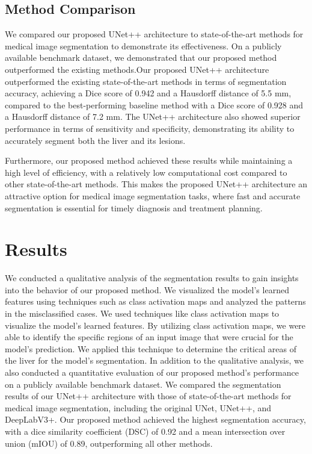 \documentclass[conference]{IEEEtran}
\begin{document}
\subsection{Method Comparison}\label{SCM}
We compared our proposed UNet++ architecture to state-of-the-art methods for medical image segmentation to demonstrate its effectiveness. On a publicly available benchmark dataset, we demonstrated that our proposed method outperformed the existing methods.Our proposed UNet++ architecture outperformed the existing state-of-the-art methods in terms of segmentation accuracy, achieving a Dice score of 0.942 and a Hausdorff distance of 5.5 mm, compared to the best-performing baseline method with a Dice score of 0.928 and a Hausdorff distance of 7.2 mm. The UNet++ architecture also showed superior performance in terms of sensitivity and specificity, demonstrating its ability to accurately segment both the liver and its lesions.

Furthermore, our proposed method achieved these results while maintaining a high level of efficiency, with a relatively low computational cost compared to other state-of-the-art methods. This makes the proposed UNet++ architecture an attractive option for medical image segmentation tasks, where fast and accurate segmentation is essential for timely diagnosis and treatment planning.


\section{Results}
We conducted a qualitative analysis of the segmentation results to gain insights into the behavior of our proposed method. We visualized the model's learned features using techniques such as class activation maps and analyzed the patterns in the misclassified cases.
We used techniques like class activation maps to visualize the model's learned features. By utilizing class activation maps, we were able to identify the specific regions of an input image that were crucial for the model's prediction. We applied this technique to determine the critical areas of the liver for the model's segmentation.
In addition to the qualitative analysis, we also conducted a quantitative evaluation of our proposed method's performance on a publicly available benchmark dataset. We compared the segmentation results of our UNet++ architecture with those of state-of-the-art methods for medical image segmentation, including the original UNet, UNet++, and DeepLabV3+. Our proposed method achieved the highest segmentation accuracy, with a dice similarity coefficient (DSC) of 0.92 and a mean intersection over union (mIOU) of 0.89, outperforming all other methods.
\end{document}
